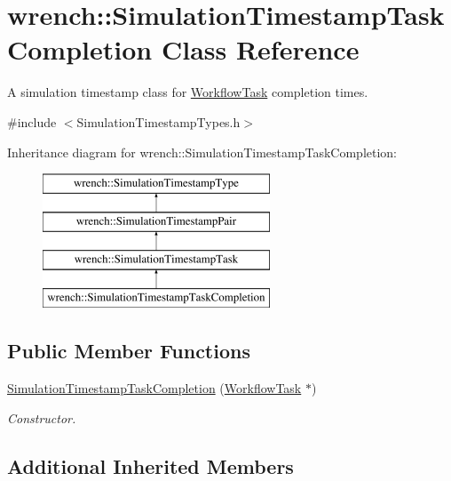 \hypertarget{classwrench_1_1_simulation_timestamp_task_completion}{}\section{wrench\+:\+:Simulation\+Timestamp\+Task\+Completion Class Reference}
\label{classwrench_1_1_simulation_timestamp_task_completion}


A simulation timestamp class for \hyperlink{classwrench_1_1_workflow_task}{Workflow\+Task} completion times.  




{\ttfamily \#include $<$Simulation\+Timestamp\+Types.\+h$>$}

Inheritance diagram for wrench\+:\+:Simulation\+Timestamp\+Task\+Completion\+:\begin{figure}[H]
\begin{center}
\leavevmode
\includegraphics[height=4.000000cm]{classwrench_1_1_simulation_timestamp_task_completion}
\end{center}
\end{figure}
\subsection*{Public Member Functions}
\begin{DoxyCompactItemize}
\item 
\hyperlink{classwrench_1_1_simulation_timestamp_task_completion_acfb9112fa3c1ec579a3ecba1b8069a29}{Simulation\+Timestamp\+Task\+Completion} (\hyperlink{classwrench_1_1_workflow_task}{Workflow\+Task} $\ast$)
\begin{DoxyCompactList}\small\item\em Constructor. \end{DoxyCompactList}\end{DoxyCompactItemize}
\subsection*{Additional Inherited Members}


